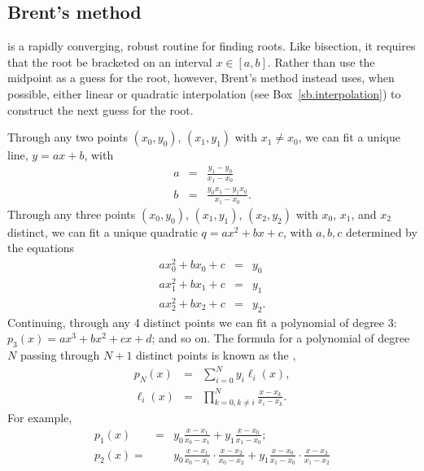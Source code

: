\subsection{Brent's method}
\cite{Brent1973Algorithms-for-} is a rapidly converging, robust routine for finding roots. Like bisection, it requires that the root be bracketed on an interval $x\in[a,b]$. Rather than use the midpoint as a guess for the root, however, Brent's method instead uses, when possible, either linear or quadratic interpolation (see Box~\ref{sb.interpolation}) to construct the next guess for the root.

\begin{sidebar}[Interpolation]
\label{sb.interpolation}
\noindent Through any two points $(x_{0},y_{0})$, $(x_{1},y_{1})$ with $x_{1}\neq x_{0}$, we can fit a unique line, $y=ax+b$, with
\begin{eqnarray*}
	a &=&  \frac{y_{1}-y_{0}}{x_{1}-x_{0}}\\
	b &=&  \frac{y_{0}x_{1} - y_{1}x_{0}}{x_{1}-x_{0}}.
\end{eqnarray*}
Through any three points $(x_{0},y_{0})$, $(x_{1},y_{1})$, $(x_{2},y_{2})$ with $x_{0}$, $x_{1}$, and $x_{2}$ distinct, we can fit a unique quadratic $q = ax^{2}+bx+c$, with $a,b,c$ determined by the equations
\begin{eqnarray*}
a x_{0}^{2} + b x_{0} + c &=& y_{0}\\
a x_{1}^{2} + b x_{1} + c &=& y_{1}\\
a x_{2}^{2} + b x_{2} + c &=& y_{2}.
\end{eqnarray*}
Continuing, through any 4 distinct points we can fit a polynomial of degree 3: $p_{3}(x) = ax^{3} + bx^{2} + cx +d$; and so on. The formula for a polynomial of degree $N$ passing through $N+1$ distinct points is known as the , 
\begin{eqnarray}
p_{N}(x) &=& \sum_{i=0}^{N} y_{i}\ell_{i}(x),\\
\ell_{i}(x) &=& \prod_{k=0,k\neq i}^{N} \frac{x-x_{k}}{x_{i}-x_{k}}.
\end{eqnarray}
For example,
\begin{eqnarray}
\label{e.lagrange-one}
p_{1}(x) &=& y_{0}\frac{x-x_{1}}{x_{0}-x_{1}} + y_{1}\frac{x-x_{0}}{x_{1}-x_{0}};\\
\label{e.lagrange-three}
p_{2}(x) =&& y_{0}\frac{x-x_{1}}{x_{0}-x_{1}}\cdot\frac{x-x_{2}}{x_{0}-x_{2}} 
	+ y_{1}\frac{x-x_{0}}{x_{1}-x_{0}}\cdot\frac{x-x_{2}}{x_{1}-x_{2}}\nonumber\\

\end{eqnarray}
\end{sidebar}
